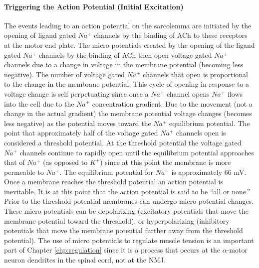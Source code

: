 \paragraph{Triggering the Action Potential (Initial Excitation)}
The events leading to an action potential on the sarcolemma are initiated by the opening of ligand gated $Na^+$ channels by the binding of ACh to these receptors at the motor end plate. The micro potentials created by the opening of the ligand gated $Na^+$ channels by the binding of ACh then open voltage gated $Na^+$ channels due to a change in voltage in the membrane potential (becoming less negative). The number of voltage gated $Na^+$ channels that open is proportional to the change in the membrane potential. This cycle of opening in response to a voltage change is self perpetuating since once a $Na^+$ channel opens $Na^+$ flows into the cell due to the $Na^+$ concentration gradient. Due to the movement (not a change in the actual gradient) the membrane potential voltage changes (becomes less negative) as the potential moves toward the $Na^+$ equilibrium potential. The point that approximately half of the voltage gated $Na^+$ channels open is considered a threshold potential. At the threshold potential the voltage gated $Na^+$ channels continue to rapidly open until the equilibrium potential approaches that of $Na^+$ (as opposed to $K^+$) since at this point the membrane is more permeable to $Na^+$. The equilibrium potential for $Na^+$ is approximately 66 mV.  Once a membrane reaches the threshold potential an action potential is inevitable. It is at this point that the action potential is said to be “all or none.” Prior to the threshold potential membranes can undergo micro potential changes. These micro potentials can be depolarizing (excitatory potentials that move the membrane potential toward the threshold), or hyperpolarizing (inhibitory potentials that move the membrane potential further away from the threshold potential). The use of micro potentials to regulate muscle tension is an important part of Chapter \ref{chp:regulation} since it is a process that occurs at the $\alpha$-motor neuron dendrites in the spinal cord, not at the NMJ.\footnotemark{}

